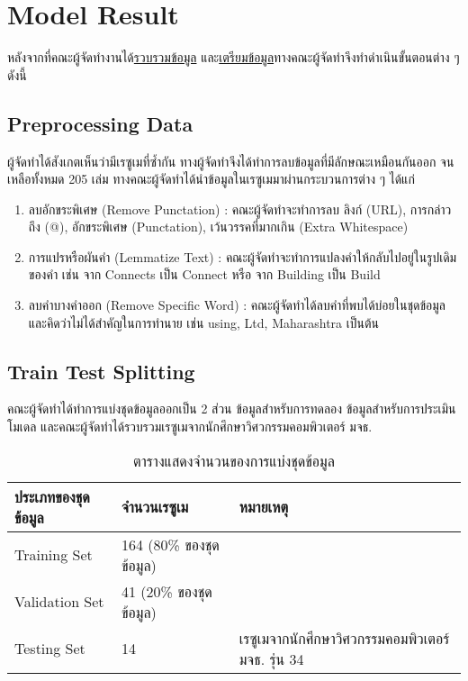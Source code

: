 \section{Model Result}
หลังจากที่คณะผู้จัดทำงานได้\hyperref[subsec:Data Collecting]{รวบรวมข้อมูล} และ\hyperref[subsec:Data Preparation]{เตรียมข้อมูล}ทางคณะผู้จัดทำจึงทำดำเนินขั้นตอนต่าง ๆ ดังนี้
\subsection{Preprocessing Data}
ผู้จัดทำได้สังเกตเห็นว่ามีเรซูเมที่ซ้ำกัน ทางผู้จัดทำจึงได้ทำการลบข้อมูลที่มีลักษณะเหมือนกันออก จนเหลือทั้งหมด 205 เล่ม
ทางคณะผู้จัดทำได้นำข้อมูลในเรซูเมมาผ่านกระบวนการต่าง ๆ ได้แก่
\begin{enumerate}
    \item ลบอักขระพิเศษ (Remove Punctation) : คณะผู้จัดทำจะทำการลบ ลิงก์ (URL), การกล่าวถึง (@), อักขระพิเศษ (Punctation), เว้นวรรคที่มากเกิน (Extra Whitespace)
    \item การแปรหรือผันคำ (Lemmatize Text) : คณะผู้จัดทำจะทำการแปลงคำให้กลับไปอยู่ในรูปเดิมของคำ เช่น จาก Connects เป็น Connect หรือ จาก Building เป็น Build
    \item ลบคำบางคำออก (Remove Specific Word) : คณะผู้จัดทำได้ลบคำที่พบได้บ่อยในชุดข้อมูล และคิดว่าไม่ได้สำคัญในการทำนาย เช่น using, Ltd, Maharashtra เป็นต้น
\end{enumerate}
\subsection{Train Test Splitting}
คณะผู้จัดทำได้ทำการแบ่งชุดข้อมูลออกเป็น 2 ส่วน ข้อมูลสำหรับการทดลอง ข้อมูลสำหรับการประเมินโมเดล
และคณะผู้จัดทำได้รวบรวมเรซูเมจากนักศึกษาวิศวกรรมคอมพิวเตอร์ มจธ.
\begin{table}[H]
    \caption{ตารางแสดงจำนวนของการแบ่งชุดข้อมูล}
    \label{tbl:train-test-split}
    \begin{tabularx}{\textwidth}{|X|X|l|} \hline
        ประเภทของชุดข้อมูล & จำนวนเรซูเม            & หมายเหตุ                                   \\ \hline
        Training Set    & 164 (80\% ของชุดข้อมูล) &                                           \\ \hline
        Validation Set  & 41 (20\% ของชุดข้อมูล)  &                                           \\ \hline
        Testing Set     & 14                   & เรซูเมจากนักศึกษาวิศวกรรมคอมพิวเตอร์ มจธ. รุ่น 34 \\ \hline
    \end{tabularx}
\end{table}
